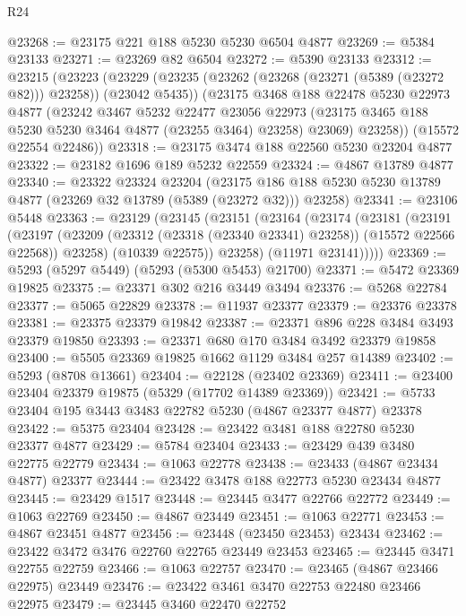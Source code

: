\begin{lexlean}{R24}
\begin{coremodule}
@23268 := @23175 @221 @188 @5230 @5230 @6504 @4877
@23269 := @5384 @23133
@23271 := @23269 @82 @6504
@23272 := @5390 @23133
@23312 := @23215
    (@23223
      (@23229
        (@23235 (@23262 (@23268 (@23271 (@5389 (@23272 @82))) @23258)) (@23042 @5435))
        (@23175
          @3468
          @188
          @22478
          @5230
          @22973
          @4877
          (@23242
            @3467
            @5232
            @22477
            @23056
            @22973
            (@23175 @3465 @188 @5230 @5230 @3464 @4877 (@23255 @3464) @23258)
            @23069)
          @23258))
      (@15572 @22554 @22486))
@23318 := @23175 @3474 @188 @22560 @5230 @23204 @4877
@23322 := @23182 @1696 @189 @5232 @22559
@23324 := @4867 @13789 @4877
@23340 := @23322
    @23324
    @23204
    (@23175 @186 @188 @5230 @5230 @13789 @4877 (@23269 @32 @13789 (@5389 (@23272 @32))) @23258)
@23341 := @23106 @5448
@23363 := @23129
    (@23145
      (@23151
        (@23164
          (@23174
            (@23181
              (@23191
                (@23197
                  (@23209 (@23312 (@23318 (@23340 @23341) @23258)) (@15572 @22566 @22568))
                  @23258)
                (@10339 @22575))
              @23258)
            (@11971 @23141)))))
@23369 := @5293 (@5297 @5449) (@5293 (@5300 @5453) @21700)
@23371 := @5472 @23369 @19825
@23375 := @23371 @302 @216 @3449 @3494
@23376 := @5268 @22784
@23377 := @5065 @22829
@23378 := @11937 @23377
@23379 := @23376 @23378
@23381 := @23375 @23379 @19842
@23387 := @23371 @896 @228 @3484 @3493 @23379 @19850
@23393 := @23371 @680 @170 @3484 @3492 @23379 @19858
@23400 := @5505 @23369 @19825 @1662 @1129 @3484 @257 @14389
@23402 := @5293 (@8708 @13661)
@23404 := @22128 (@23402 @23369)
@23411 := @23400 @23404 @23379 @19875 (@5329 (@17702 @14389 @23369))
@23421 := @5733 @23404 @195 @3443 @3483 @22782 @5230 (@4867 @23377 @4877) @23378
@23422 := @5375 @23404
@23428 := @23422 @3481 @188 @22780 @5230 @23377 @4877
@23429 := @5784 @23404
@23433 := @23429 @439 @3480 @22775 @22779
@23434 := @1063 @22778
@23438 := @23433 (@4867 @23434 @4877) @23377
@23444 := @23422 @3478 @188 @22773 @5230 @23434 @4877
@23445 := @23429 @1517
@23448 := @23445 @3477 @22766 @22772
@23449 := @1063 @22769
@23450 := @4867 @23449
@23451 := @1063 @22771
@23453 := @4867 @23451 @4877
@23456 := @23448 (@23450 @23453) @23434
@23462 := @23422 @3472 @3476 @22760 @22765 @23449 @23453
@23465 := @23445 @3471 @22755 @22759
@23466 := @1063 @22757
@23470 := @23465 (@4867 @23466 @22975) @23449
@23476 := @23422 @3461 @3470 @22753 @22480 @23466 @22975
@23479 := @23445 @3460 @22470 @22752

\end{coremodule}
\end{lexlean}
